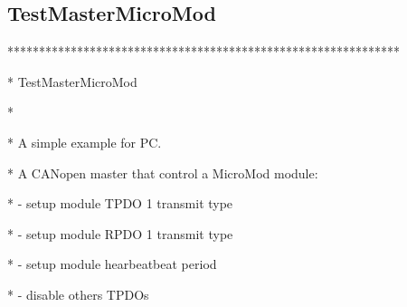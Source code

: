 \documentclass[a4paper,12pt]{book}
\newcommand{\canopen}{CANopen}
\begin{document}
\bigskip

\subsection{TestMasterMicroMod }
{\ttfamily
**************************************************************}

{\ttfamily
* \space TestMasterMicroMod
\space \space \space \space \space \space \space \space \space \space \space \space \space \space \space \space \space \space \space \space \space \space \space \space \space \space \space \space \space \space \space \space \space \space \space \space \space \space \space *}

{\ttfamily
*
\space \space \space \space \space \space \space \space \space \space \space \space \space \space \space \space \space \space \space \space \space \space \space \space \space \space \space \space \space \space \space \space \space \space \space \space \space \space \space \space \space \space \space \space \space \space \space \space \space \space \space \space \space \space \space \space \space \space \space *}

{\ttfamily
* \space A simple example for PC.
\space \space \space \space \space \space \space \space \space \space \space \space \space \space \space \space \space \space \space \space \space \space \space \space \space \space \space \space \space \space \space \space \space *}

{\ttfamily
* \space A \canopen{} master that control a MicroMod module:
\space \space \space \space \space \space \space \space \space *}

{\ttfamily
* \space {}- setup module TPDO 1 transmit type
\space \space \space \space \space \space \space \space \space \space \space \space \space \space \space \space \space \space \space \space \space \space *}

{\ttfamily
* \space {}- setup module RPDO 1 transmit type
\space \space \space \space \space \space \space \space \space \space \space \space \space \space \space \space \space \space \space \space \space \space *}

{\ttfamily
* \space {}- setup module hearbeatbeat period
\space \space \space \space \space \space \space \space \space \space \space \space \space \space \space \space \space \space \space \space \space \space \space *}

{\ttfamily
* \space {}- disable others TPDOs
\space \space \space \space \space \space \space \space \space \space \space \space \space \space \space \space \space \space \space \space \space \space \space \space \space \space \space \space \space \space \space \space \space \space \space *}
\end{document}
